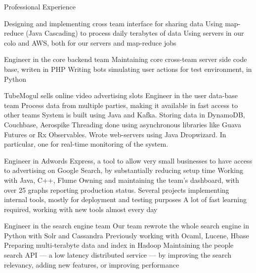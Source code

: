 \begin{rubric}{\color{ForestGreen} Professional Experience}

  Designing and implementing cross team interface for sharing data
  Using map-reduce (Java Cascading) to process daily terabytes of data
  Using servers in our colo and AWS, both for our servers and map-reduce jobs


  Engineer in the core backend team
  Maintaining core cross-team server side code base, writen in PHP
  Writing bots simulating user actions for test environment, in Python


   TubeMogul sells online video advertising slots
  Engineer in the user data-base team
  Process data from multiple parties, making it
available in fast access to other teams
  System is built using Java and Kafka. Storing data in DynamoDB, Couchbase,
 Aerospike
 \entry* Threading done using asynchronous libraries like Guava Futures or Rx Observables.
 \entry* Wrote web-servers using Java Dropwizard. In particular, one for real-time monitoring of the system.


  \entry*[\multicolumn{1}{@{}>{\mykeyfont}p{2.5cm}}{%
\color{ForestGreen} {Feb 13 - Sep 14} \newline
\color{NavyBlue} G\color{Red} o\color{YellowOrange} o\color{NavyBlue} g\color{ForestGreen} l\color{Red} e}]
  Engineer in {Adwords Express}, a tool to allow very small businesses to have access to
 advertising on Google Search, by substantially reducing setup time
   Working with Java, C++, Flume
  Owning and maintaining the team's dashboard, with over 25 graphs reporting production status.
 \entry* Several projects implementing internal tools, mostly for deployment and testing purposes
 \entry* A lot of fast learning required, working with new tools almost every day


  Engineer in the {search engine team}
 Our team rewrote the whole search engine in Python with Solr and Cassandra
 Previously working with Ocaml, Lucene, Hbase
  Preparing multi-terabyte data and index in Hadoop
  \entry*
  Maintaining the people search API --- a low latency distributed
  service --- by improving the search relevancy, adding new features,
  or improving performance



\end{rubric}
